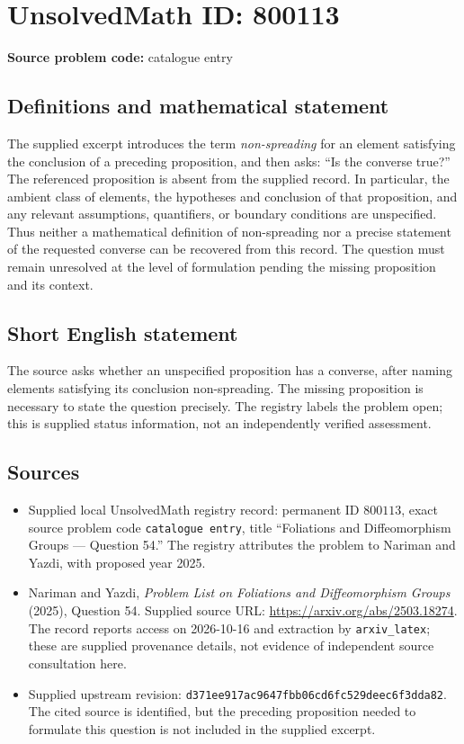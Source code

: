 \documentclass[11pt]{article}
\begin{document}
\section*{UnsolvedMath ID: 800113}
\textbf{Source problem code:} catalogue entry
\subsection{Definitions and mathematical statement}
The supplied excerpt introduces the term \emph{non-spreading} for an element satisfying the conclusion of a preceding proposition, and then asks: ``Is the converse true?'' The referenced proposition is absent from the supplied record. In particular, the ambient class of elements, the hypotheses and conclusion of that proposition, and any relevant assumptions, quantifiers, or boundary conditions are unspecified. Thus neither a mathematical definition of non-spreading nor a precise statement of the requested converse can be recovered from this record. The question must remain unresolved at the level of formulation pending the missing proposition and its context.
\subsection{Short English statement}
The source asks whether an unspecified proposition has a converse, after naming elements satisfying its conclusion non-spreading. The missing proposition is necessary to state the question precisely. The registry labels the problem open; this is supplied status information, not an independently verified assessment.
\subsection{Sources}
\begin{itemize}
\item Supplied local UnsolvedMath registry record: permanent ID \(800113\), exact source problem code \texttt{catalogue entry}, title ``Foliations and Diffeomorphism Groups --- Question 54.'' The registry attributes the problem to Nariman and Yazdi, with proposed year 2025.
\item Nariman and Yazdi, \emph{Problem List on Foliations and Diffeomorphism Groups} (2025), Question 54. Supplied source URL: \url{https://arxiv.org/abs/2503.18274}. The record reports access on 2026-10-16 and extraction by \texttt{arxiv\_latex}; these are supplied provenance details, not evidence of independent source consultation here.
\item Supplied upstream revision: \texttt{d371ee917ac9647fbb06cd6fc529deec6f3dda82}. The cited source is identified, but the preceding proposition needed to formulate this question is not included in the supplied excerpt.
\end{itemize}
\end{document}
